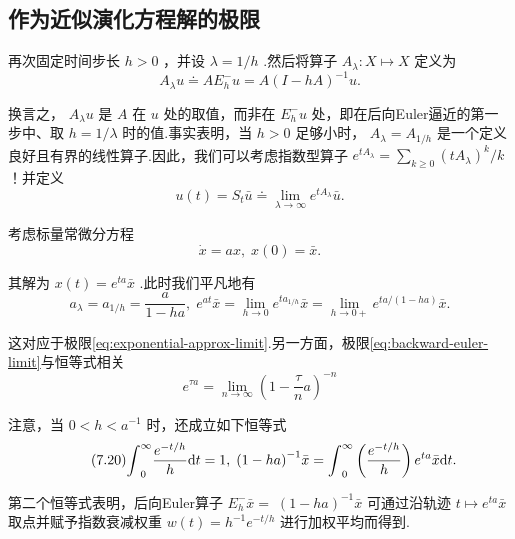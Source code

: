 \subsection{作为近似演化方程解的极限}

再次固定时间步长 $h > 0$ ，并设 $\lambda  = 1/h$ .然后将算子 ${A}_{\lambda } : X \mapsto  X$ 定义为
\[
{A}_{\lambda }u \doteq  A{E}_{h}^{ - }u = A{\left( I - hA\right) }^{-1}u.
\]

换言之， ${A}_{\lambda }u$ 是 $A$ 在 $u$ 处的取值，而非在 ${E}_{h}^{ - }u$ 处，即在后向Euler逼近的第一步中、取 $h = 1/\lambda$ 时的值.事实表明，当 $h > 0$ 足够小时， ${A}_{\lambda } = {A}_{1/h}$ 是一个定义良好且有界的线性算子.因此，我们可以考虑指数型算子 ${e}^{t{A}_{\lambda }} = \mathop{\sum }\limits_{{k \geq  0}}{\left( t{A}_{\lambda }\right) }^{k}/k$ ！并定义
\begin{equation}\tag{7.19}\label{eq:exponential-approx-limit}
u\left( t\right)  = {S}_{t}\bar{u} \doteq  \mathop{\lim }\limits_{{\lambda  \rightarrow  \infty }}{e}^{t{A}_{\lambda }}\bar{u}.
\end{equation}

\begin{instance}\label{ins:scalar-euler}
考虑标量常微分方程
\[
\dot{x} = {ax},\;x\left( 0\right)  = \bar{x}.
\]

其解为 $x\left( t\right)  = {e}^{ta}\bar{x}$ .此时我们平凡地有
\[
{a}_{\lambda } = {a}_{1/h} = \frac{a}{1 - {ha}},\;{e}^{at}\bar{x} = \mathop{\lim }\limits_{{h \rightarrow  0}}{e}^{t{a}_{1/h}}\bar{x} = \mathop{\lim }\limits_{{h \rightarrow  0 + }}{e}^{{ta}/\left( {1 - {ha}}\right) }\bar{x}.
\]

这对应于极限\eqref{eq:exponential-approx-limit}.另一方面，极限\eqref{eq:backward-euler-limit}与恒等式相关
\[
{e}^{\tau a} = \mathop{\lim }\limits_{{n \rightarrow  \infty }}{\left( 1 - \frac{\tau }{n}a\right) }^{-n}
\]

注意，当 $0 < h < {a}^{-1}$ 时，还成立如下恒等式
\begin{equation}\tag{7.20}\label{eq:scalar-backward-euler-average}
{\int }_{0}^{\infty }\frac{{e}^{-t/h}}{h}{\mathop{}\!\mathrm{d} t} = 1,\;{\left( 1 - ha\right) }^{-1}\bar{x} = {\int }_{0}^{\infty }\left( \frac{{e}^{-t/h}}{h}\right) {e}^{ta}\bar{x}{\mathop{}\!\mathrm{d} t}.
\end{equation}

第二个恒等式表明，后向Euler算子 ${E}_{h}^{ - }\bar{x} = \; {\left( 1 - ha\right) }^{-1}\bar{x}$ 可通过沿轨迹 $t \mapsto  {e}^{ta}\bar{x}$ 取点并赋予指数衰减权重 $w\left( t\right)  = {h}^{-1}{e}^{-t/h}$ 进行加权平均而得到.
\end{instance}

